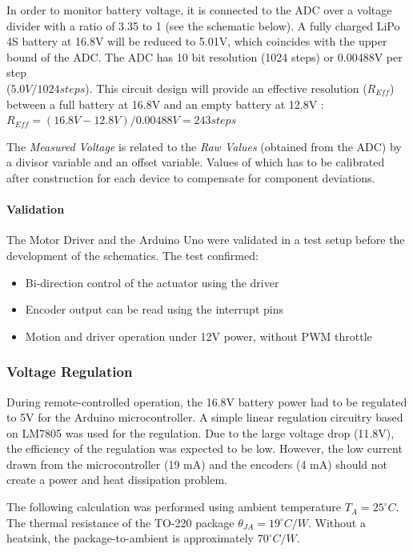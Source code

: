 In order to monitor battery voltage, it is connected to the ADC over a voltage divider with a ratio of 3.35 to 1 (see the schematic below). A fully charged LiPo 4S battery at 16.8V will be reduced to 5.01V, which coincides with the upper bound of the ADC. The ADC has 10 bit resolution (1024 steps) or 0.00488V per step \\($5.0V / 1024 steps$). This circuit design will provide an effective resolution ($R_{Eff}$) between a full battery at 16.8V and an empty battery at 12.8V :
\\ $R_{Eff} = (16.8V - 12.8V) / 0.00488V = 243 steps$

The \textit{Measured Voltage} is related to the \textit{Raw Values} (obtained from the ADC) by a divisor variable and an offset variable. Values of which has to be calibrated after construction for each device to compensate for component deviations.

\paragraph{Validation}

The Motor Driver and the Arduino Uno were validated in a test setup before the development of the schematics. The test confirmed:
\begin{itemize}
    \item Bi-direction control of the actuator using the driver
    \item Encoder output can be read using the interrupt pins
    \item Motion and driver operation under 12V power, without PWM throttle
\end{itemize}

\subsubsection{Voltage Regulation}
\label{subsubsection:exploration-1-voltage-regulation}

During remote-controlled operation, the 16.8V battery power had to be regulated to 5V for the Arduino microcontroller. A simple linear regulation circuitry based on LM7805 was used for the regulation. Due to the large voltage drop (11.8V), the efficiency of the regulation was expected to be low. However, the low current drawn from the microcontroller (19 mA) and the encoders (4 mA) should not create a power and heat dissipation problem.

The following calculation was performed using ambient temperature $T_A = 25^{\circ}C$. The thermal resistance of the TO-220 package $\theta_{JA} = 19^{\circ}C/W$. Without a heatsink, the package-to-ambient is approximately $70 ^{\circ}C/W$.

